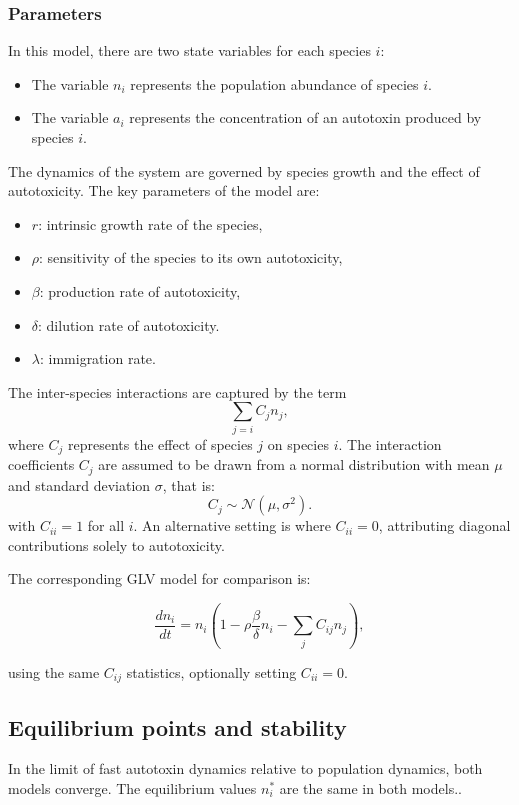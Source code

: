 \documentclass[11pt,a4paper,fleqn]{article}
\begin{document}
\subsubsection{Parameters}
In this model, there are two state variables for each species \( i \):
\begin{itemize}
    \item The variable \( n_i \) represents the population abundance of species \( i \).
    \item The variable \( a_i \) represents the concentration of an autotoxin produced by species \( i \).
\end{itemize}

The dynamics of the system are governed by species growth and the effect of autotoxicity. The key parameters of the model are:
\begin{itemize}
    \item \( r \): intrinsic growth rate of the species,
    \item \( \rho \): sensitivity of the species to its own autotoxicity,
    \item \( \beta \): production rate of autotoxicity,
    \item \( \delta \): dilution rate of autotoxicity.
    \item \( \lambda \): immigration rate.
\end{itemize}

The inter-species interactions are captured by the term
\[
\sum_{j = i} C_{j} n_j,
\]
where \( C_j \) represents the effect of species \( j \) on species \( i \). 
The interaction coefficients \( C_j \) are assumed to be drawn from a 
normal distribution with mean \( \mu \) and standard deviation \( \sigma \), 
that is:
\[
C_j \sim \mathcal{N}(\mu, \sigma^2). 
\]
with $C_{ii} = 1$ for all $i$. An alternative setting is where $C_{ii} = 0$, attributing diagonal contributions solely to autotoxicity.

The corresponding GLV model for comparison is:

\begin{equation}
\frac{dn_i}{dt} = n_i \left(1 - \rho \frac{\beta}{\delta} n_i - \sum_j C_{ij} n_j \right), \label{eq:5}
\end{equation}

using the same $C_{ij}$ statistics, optionally setting $C_{ii} = 0$.

\subsection{Equilibrium points and stability}
In the limit of fast autotoxin dynamics relative to population dynamics, both models converge.
The equilibrium values $n_i^*$ are the same in both models..
\end{document}

